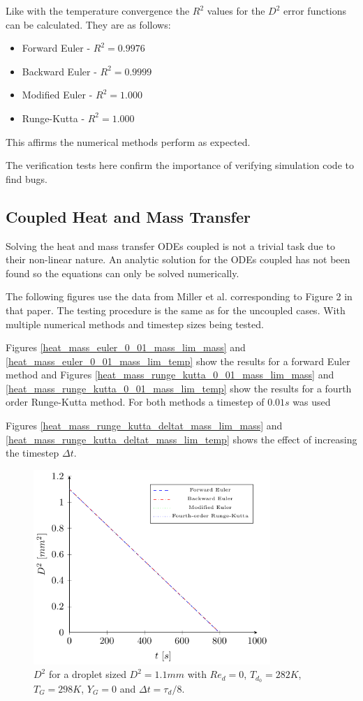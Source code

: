 \documentclass[../Interim_Report_Master]{subfiles}
\begin{document}
Like with the temperature convergence the $R^2$ values for the $D^2$ error functions can be calculated. They are as follows:
\begin{itemize}
	\item Forward Euler - $R^2=0.9976$
	\item Backward Euler - $R^2=0.9999$
	\item Modified Euler - $R^2=1.000$
	\item Runge-Kutta - $R^2=1.000$
\end{itemize}

This affirms the numerical methods perform as expected.

The verification tests here confirm the importance of verifying simulation code to find bugs.

\newpage

\subsection{Coupled Heat and Mass Transfer}
Solving the heat and mass transfer ODEs coupled is not a trivial task due to their non-linear nature. An analytic solution for the ODEs coupled has not been found so the equations can only be solved numerically. 

The following figures use the data from Miller et al. corresponding to Figure 2 in that paper. The testing procedure is the same as for the uncoupled cases. With multiple numerical methods and timestep sizes being tested.

 Figures \ref{heat_mass_euler_0_01_mass_lim_mass} and \ref{heat_mass_euler_0_01_mass_lim_temp} show the results for a forward Euler method and Figures \ref{heat_mass_runge_kutta_0_01_mass_lim_mass} and \ref{heat_mass_runge_kutta_0_01_mass_lim_temp} show the results for a fourth order Runge-Kutta method. For both methods a timestep of $0.01s$ was used

Figures \ref{heat_mass_runge_kutta_deltat_mass_lim_mass} and \ref{heat_mass_runge_kutta_deltat_mass_lim_temp} shows the effect of increasing the timestep  $\Delta t$.
\begin{figure}[H]
	\centering
	\includegraphics[width=0.8\textwidth]{./Diagrams/Coupled_Heat_Mass_Transfer_tau_8/Coupled_d2_Transfer_tau_8.pdf}
	\caption{$D^2$ for a droplet sized $D^2=1.1mm$ with $Re_d=0$, $T_{d_0}=282K$, $T_G=298K$, $Y_G=0$ and $\Delta t=\tau_d/8$.}
	\label{coupled_d2_tau_8}
\end{figure}
\end{document}
